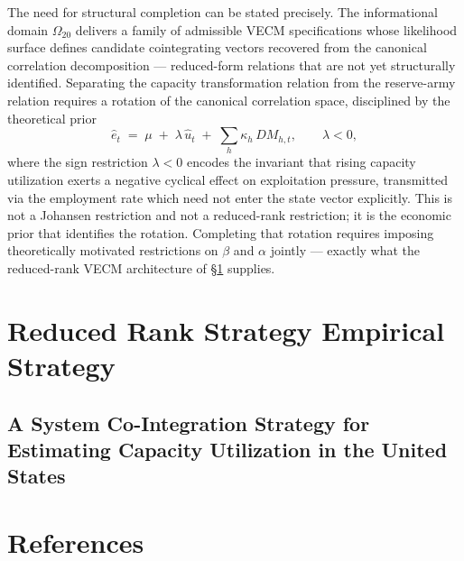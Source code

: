 \documentclass[11pt,a4paper]{article}
\begin{document}

The need for structural completion can be stated precisely. The informational
domain $\Omega_{20}$ delivers a family of admissible VECM specifications
whose likelihood surface defines candidate cointegrating vectors recovered
from the canonical correlation decomposition --- reduced-form relations that
are not yet structurally identified. Separating the capacity transformation relation from
the reserve-army relation requires a rotation of the canonical correlation
space, disciplined by the theoretical prior
%
\begin{equation}
	\label{eq:S2_rotation}
	\hat{e}_t \;=\; \mu \;+\; \lambda\,\hat{u}_t
	\;+\; \sum_{h} \kappa_h \, DM_{h,t},
	\qquad \lambda < 0,
\end{equation}
%
where the sign restriction $\lambda < 0$ encodes the invariant that rising
capacity utilization exerts a negative cyclical effect on exploitation
pressure, transmitted via the employment rate which need not enter the state
vector explicitly. This is not a Johansen restriction and not a reduced-rank
restriction; it is the economic prior that identifies the rotation. Completing
that rotation requires imposing theoretically motivated restrictions on
$\beta$ and $\alpha$ jointly --- exactly what the reduced-rank VECM
architecture of \S\ref{sec:4reduced_rank} supplies.

\section{Reduced Rank Strategy Empirical Strategy}
\label{sec:4reduced_rank}

\subsection{A System Co-Integration Strategy for Estimating Capacity Utilization in the United States}

\pagebreak
\section{References}


\label{references}

\pagebreak
\appendix
\end{document}
